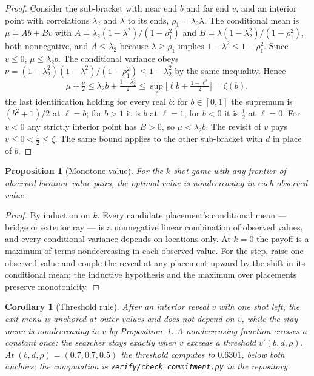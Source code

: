 \documentclass[11pt]{article}
\theoremstyle{itheads}
\newtheorem{proposition}{Proposition}
\newtheorem{corollary}{Corollary}
\begin{document}
\begin{proof}
Consider the sub-bracket with near end $b$ and far end $v$, and an
interior point with correlations $\lambda_2$ and $\lambda$ to its
ends, $\rho_1 = \lambda_2 \lambda$. The conditional mean is
$\mu = A b + B v$ with
$A = \lambda_2 (1-\lambda^2)/(1-\rho_1^2)$ and
$B = \lambda (1-\lambda_2^2)/(1-\rho_1^2)$, both nonnegative, and
$A \le \lambda_2$ because $\lambda \ge \rho_1$ implies
$1-\lambda^2 \le 1-\rho_1^2$. Since $v \le 0$,
$\mu \le \lambda_2 b$. The conditional variance obeys
$\nu = (1-\lambda_2^2)(1-\lambda^2)/(1-\rho_1^2)
\le 1-\lambda_2^2$ by the same inequality. Hence
\[
\mu + \tfrac{\nu}{2} \le \lambda_2 b + \tfrac{1-\lambda_2^2}{2}
\le \sup_{\ell} \Big[ \ell b + \tfrac{1-\ell^2}{2} \Big]
= \zeta(b),
\]
the last identification holding for every real $b$: for
$b \in [0,1]$ the supremum is $(b^2+1)/2$ at $\ell = b$; for $b > 1$
it is $b$ at $\ell = 1$; for $b < 0$ it is $\tfrac12$ at
$\ell = 0$. For $v < 0$ any strictly interior point has $B > 0$, so
$\mu < \lambda_2 b$. The revisit of $v$ pays $v \le 0 < \tfrac12
\le \zeta$. The same bound applies to the other sub-bracket with $d$
in place of $b$.
\end{proof}

\begin{proposition}[Monotone value]\label{prop:monotone}
For the $k$-shot game with any frontier of observed location--value
pairs, the optimal value is nondecreasing in each observed value.
\end{proposition}

\begin{proof}
By induction on $k$. Every candidate placement's conditional mean ---
bridge or exterior ray --- is a nonnegative linear combination of
observed values, and every conditional variance depends on locations
only. At $k=0$ the payoff is a maximum of terms nondecreasing in each
observed value. For the step, raise one observed value and couple the
reveal at any placement upward by the shift in its conditional mean;
the inductive hypothesis and the maximum over placements preserve
monotonicity.
\end{proof}

\begin{corollary}[Threshold rule]\label{cor:threshold}
After an interior reveal $v$ with one shot left, the exit menu is
anchored at outer values and does not depend on $v$, while the stay
menu is nondecreasing in $v$ by Proposition~\ref{prop:monotone}. A
nondecreasing function crosses a constant once: the searcher stays
exactly when $v$ exceeds a threshold $v'(b,d,\rho)$. At
$(b,d,\rho) = (0.7, 0.7, 0.5)$ the threshold computes to $0.6301$,
below both anchors; the computation is
\texttt{verify/check\_commitment.py} in the repository.
\end{corollary}
\end{document}
